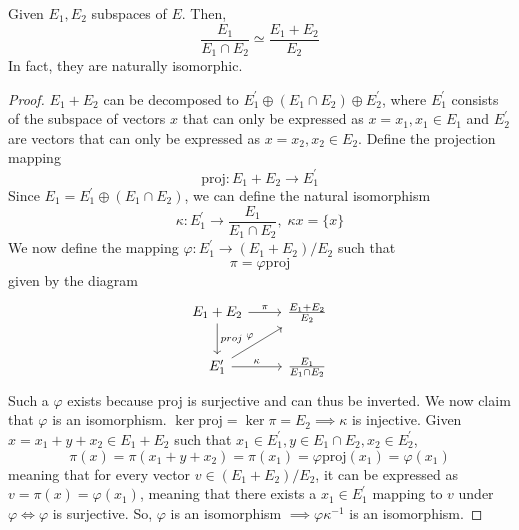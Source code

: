   \begin{theorem}
    Given $E_1, E_2$ subspaces of $E$. Then, 
    \begin{equation}
      \frac{E_1}{E_1 \cap E_2} \simeq \frac{E_1 + E_2}{E_2}
    \end{equation}
    In fact, they are naturally isomorphic. 
  \end{theorem}
  \begin{proof}
    $E_1 + E_2$ can be decomposed to $E_1^\prime \oplus (E_1 \cap E_2) \oplus E_2^\prime$, where $E_1^\prime$ consists of the subspace of vectors $x$ that can only be expressed as $x = x_1, x_1 \in E_1$ and $E_2^\prime$ are vectors that can only be expressed as $x = x_2, x_2 \in E_2$. Define the projection mapping
    \begin{equation}
      \text{proj}: E_1 + E_2 \longrightarrow E_1^\prime
    \end{equation}
    Since $E_1 = E_1^\prime \oplus (E_1 \cap E_2)$, we can define the natural isomorphism 
    \begin{equation}
      \kappa: E_1^\prime \longrightarrow \frac{E_1}{E_1 \cap E_2}, \; \kappa{x} = \{x\}
    \end{equation}
    We now define the mapping $\varphi: E_1^\prime \longrightarrow (E_1 + E_2) / E_2$ such that
    \begin{equation}
      \pi = \varphi \text{proj}
    \end{equation}
    given by the diagram 
    \[\begin{tikzcd} 
        E_1 + E_2 \arrow{d}{proj} \arrow{r}{\pi} & \frac{E_1 + E_2}{E_2} \\
        E_1^\prime \arrow{ru}{\varphi} \arrow{r}{\kappa} & \frac{E_1}{E_1 \cap E_2}
    \end{tikzcd}\]
    Such a $\varphi$ exists because proj is surjective and can thus be inverted. We now claim that $\varphi$ is an isomorphism. $\ker{\text{proj}} = \ker{\pi} = E_2 \implies \kappa$ is injective. Given $x = x_1 + y + x_2 \in E_1 + E_2$ such that $x_1 \in E_1^\prime, y \in E_1 \cap E_2, x_2 \in E_2^\prime$, 
    \begin{equation}
      \pi(x) = \pi(x_1 + y + x_2) = \pi(x_1) = \varphi \text{proj} (x_1) = \varphi (x_1)
    \end{equation}
    meaning that for every vector $v \in (E_1 + E_2) / E_2$, it can be expressed as $v = \pi (x) = \varphi (x_1)$, meaning that there exists a $x_1 \in E_1^\prime$ mapping to $v$ under $\varphi \iff \varphi$ is surjective. So, $\varphi$ is an isomorphism $\implies \varphi \kappa^{-1}$ is an isomorphism.  
  \end{proof}

